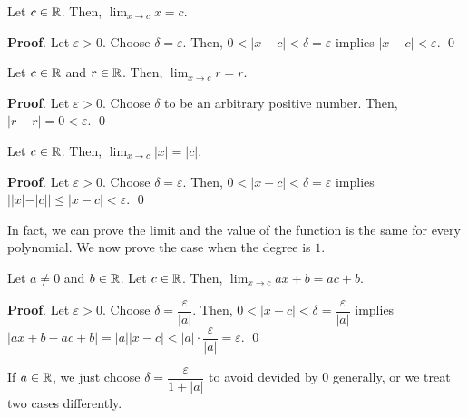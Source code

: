 \documentclass[11pt]{book}
\begin{document}
\begin{proposition}
    Let $c\in\mathbb{R}$. Then, $\displaystyle\lim_{x\to c}x=c.$
\end{proposition}
\textbf{Proof}. Let $\varepsilon>0$. Choose $\delta=\varepsilon$. Then, $0<|x-c|<\delta=\varepsilon$ implies $|x-c|<\varepsilon$. \qed

\begin{proposition}
    Let $c\in\mathbb{R}$ and $r\in\mathbb{R}$. Then, $\displaystyle\lim_{x\to c}r=r.$
\end{proposition}
\textbf{Proof}. Let $\varepsilon>0$. Choose $\delta$ to be an arbitrary positive number. Then, $|r-r|=0<\varepsilon$. \qed

\begin{proposition}
    Let $c\in\mathbb{R}$. Then, $\displaystyle\lim_{x\to c}|x|=|c|.$
\end{proposition}
\textbf{Proof}. Let $\varepsilon>0$. Choose $\delta=\varepsilon$. Then, $0<|x-c|<\delta=\varepsilon$ implies $||x|-|c||\leq|x-c|<\varepsilon$. \qed


In fact, we can prove the limit and the value of the function is the same for every polynomial. We now prove the case when the degree is $1$.

\begin{proposition}
    Let $a\ne 0$ and $b\in\mathbb{R}$. Let $c\in\mathbb{R}$. Then, $\displaystyle\lim_{x\to c}ax+b=ac+b.$
\end{proposition}
\textbf{Proof}. Let $\varepsilon>0$. Choose $\delta=\dfrac{\varepsilon}{|a|}$. Then, $0<|x-c|<\delta=\dfrac{\varepsilon}{|a|}$ implies $|ax+b-ac+b|=|a||x-c|<|a|\cdot\dfrac{\varepsilon}{|a|}=\varepsilon$. \qed

\begin{remark}
    If $a\in\mathbb{R}$, we just choose $\delta=\dfrac{\varepsilon}{1+|a|}$ to avoid devided by $0$ generally, or we treat two cases differently.
\end{remark}
\end{document}
